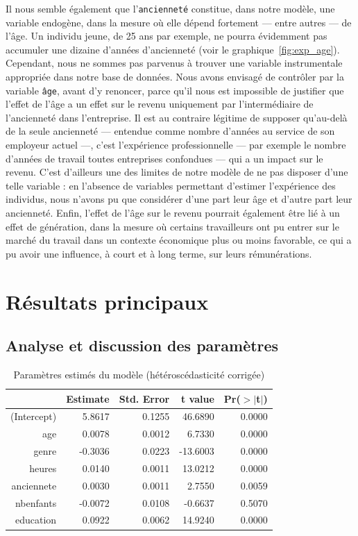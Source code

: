 \documentclass[a4paper, french, 11 pt]{article}\usepackage[]{graphicx}\usepackage[]{xcolor}
\begin{document}
Il nous semble également que l'\texttt{ancienneté} constitue, dans notre modèle, une variable endogène, dans la mesure où elle dépend fortement --- entre autres --- de l'âge. Un individu jeune, de 25 ans par exemple, ne pourra évidemment pas accumuler une dizaine d’années d’ancienneté (voir le graphique~\ref{fig:exp_age}). Cependant, nous ne sommes pas parvenus à trouver une variable instrumentale appropriée dans notre base de données. Nous avons envisagé de contrôler par la variable \texttt{âge}, avant d'y renoncer, parce qu'il nous est impossible de justifier que l'effet de l'âge a un effet sur le revenu uniquement par l'intermédiaire de l'ancienneté dans l'entreprise. Il est au contraire légitime de supposer qu'au-delà de la seule ancienneté --- entendue comme nombre d'années au service de son employeur actuel ---, c'est l'expérience professionnelle ---  par exemple le nombre d'années de travail toutes entreprises confondues --- qui a un impact sur le revenu. C'est d'ailleurs une des limites de notre modèle de ne pas disposer d'une telle variable : en l'absence de variables permettant d'estimer l'expérience des individus, nous n'avons pu que considérer d'une part leur âge et d'autre part leur ancienneté. Enfin, l'effet de l'âge sur le revenu pourrait également être lié à un effet de génération, dans la mesure où certains travailleurs ont pu entrer sur le marché du travail dans un contexte économique plus ou moins favorable, ce qui a pu avoir une influence, à court et à long terme, sur leurs rémunérations. 
        

\section{Résultats principaux}

\subsection{Analyse et discussion des paramètres}

\begin{table}[ht]
\centering
\caption{Paramètres estimés du modèle (hétéroscédasticité corrigée)} 
\label{tb:lm1}
\begin{tabular}{rrrrr}
  \toprule
 & Estimate & Std. Error & t value & Pr($>$$|$t$|$) \\ 
  \midrule
(Intercept) & 5.8617 & 0.1255 & 46.6890 & 0.0000 \\ 
  age & 0.0078 & 0.0012 & 6.7330 & 0.0000 \\ 
  genre & -0.3036 & 0.0223 & -13.6003 & 0.0000 \\ 
  heures & 0.0140 & 0.0011 & 13.0212 & 0.0000 \\ 
  anciennete & 0.0030 & 0.0011 & 2.7550 & 0.0059 \\ 
  nbenfants & -0.0072 & 0.0108 & -0.6637 & 0.5070 \\ 
  education & 0.0922 & 0.0062 & 14.9240 & 0.0000 \\ 
   \bottomrule
\end{tabular}
\end{table}
\end{document}
